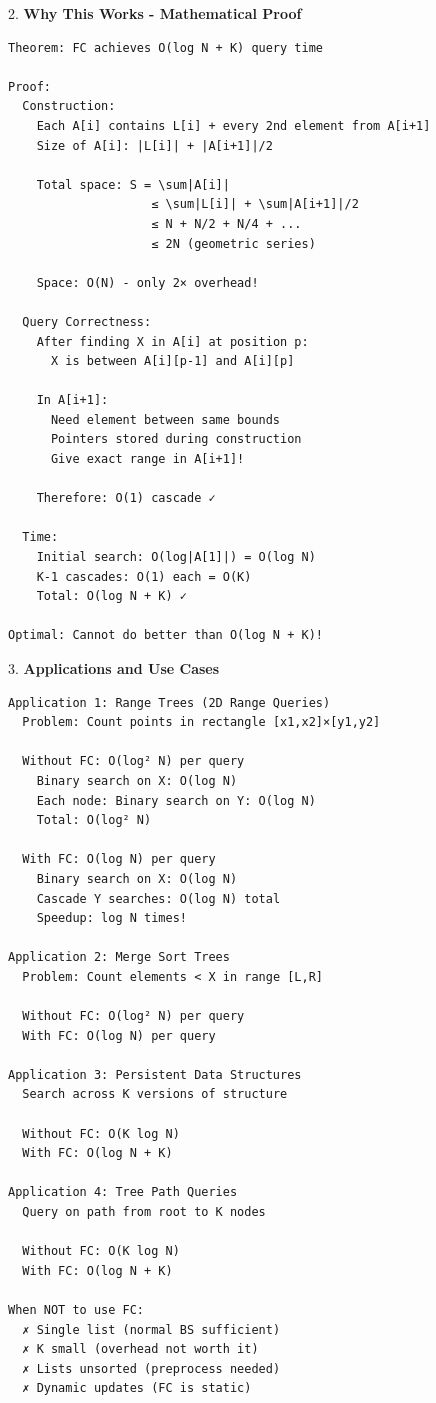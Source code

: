 \documentclass[11pt,a4paper,oneside]{book}
\begin{document}
\begin{tcolorbox}[
    enhanced,breakable,
    colback=white,
    colframe=deepblue,
    boxrule=1.5pt,
    arc=3mm,
    title=\textbf{The Ultimate Search Optimization}
]
2. \textbf{Why This Works - Mathematical Proof}
\begin{verbatim}
Theorem: FC achieves O(log N + K) query time

Proof:
  Construction:
    Each A[i] contains L[i] + every 2nd element from A[i+1]
    Size of A[i]: |L[i]| + |A[i+1]|/2
    
    Total space: S = \sum|A[i]|
                    ≤ \sum|L[i]| + \sum|A[i+1]|/2
                    ≤ N + N/2 + N/4 + ... 
                    ≤ 2N (geometric series)
    
    Space: O(N) - only 2× overhead!
  
  Query Correctness:
    After finding X in A[i] at position p:
      X is between A[i][p-1] and A[i][p]
    
    In A[i+1]:
      Need element between same bounds
      Pointers stored during construction
      Give exact range in A[i+1]!
    
    Therefore: O(1) cascade ✓
  
  Time:
    Initial search: O(log|A[1]|) = O(log N)
    K-1 cascades: O(1) each = O(K)
    Total: O(log N + K) ✓

Optimal: Cannot do better than O(log N + K)!
\end{verbatim}

3. \textbf{Applications and Use Cases}
\begin{verbatim}
Application 1: Range Trees (2D Range Queries)
  Problem: Count points in rectangle [x1,x2]×[y1,y2]
  
  Without FC: O(log² N) per query
    Binary search on X: O(log N)
    Each node: Binary search on Y: O(log N)
    Total: O(log² N)
  
  With FC: O(log N) per query
    Binary search on X: O(log N)
    Cascade Y searches: O(log N) total
    Speedup: log N times!

Application 2: Merge Sort Trees
  Problem: Count elements < X in range [L,R]
  
  Without FC: O(log² N) per query
  With FC: O(log N) per query

Application 3: Persistent Data Structures
  Search across K versions of structure
  
  Without FC: O(K log N)
  With FC: O(log N + K)

Application 4: Tree Path Queries
  Query on path from root to K nodes
  
  Without FC: O(K log N)
  With FC: O(log N + K)

When NOT to use FC:
  ✗ Single list (normal BS sufficient)
  ✗ K small (overhead not worth it)
  ✗ Lists unsorted (preprocess needed)
  ✗ Dynamic updates (FC is static)
\end{verbatim}


\end{tcolorbox}
\end{document}
